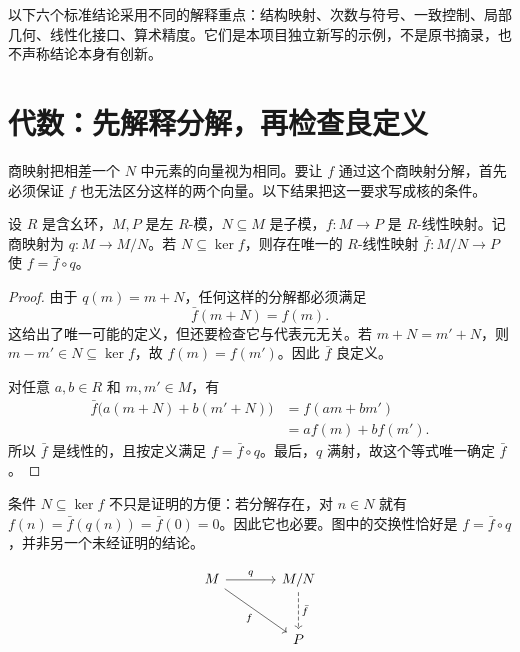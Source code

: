 \documentclass[11pt,a4paper,fontset=fandol,scheme=plain]{ctexart}
\begin{document}

以下六个标准结论采用不同的解释重点：结构映射、次数与符号、一致控制、局部几何、线性化接口、算术精度。它们是本项目独立新写的示例，不是原书摘录，也不声称结论本身有创新。

\medskip

\section{代数：先解释分解，再检查良定义}

商映射把相差一个 $N$ 中元素的向量视为相同。要让 $f$ 通过这个商映射分解，首先必须保证 $f$ 也无法区分这样的两个向量。以下结果把这一要求写成核的条件。

\begin{proposition}[商模因子化]\label{thm:quotient-factorization}

设 $R$ 是含幺环，$M,P$ 是左 $R$-模，$N\subseteq M$ 是子模，$f\colon M\to P$ 是 $R$-线性映射。记商映射为 $q\colon M\to M/N$。若 $N\subseteq\ker f$，则存在唯一的 $R$-线性映射 $\bar f\colon M/N\to P$ 使 $f=\bar f\circ q$。

\end{proposition}

\begin{proof}

由于 $q(m)=m+N$，任何这样的分解都必须满足
\[
\bar f(m+N)=f(m).
\]
这给出了唯一可能的定义，但还要检查它与代表元无关。若 $m+N=m'+N$，则 $m-m'\in N\subseteq\ker f$，故 $f(m)=f(m')$。因此 $\bar f$ 良定义。

对任意 $a,b\in R$ 和 $m,m'\in M$，有
\[
\begin{aligned}
\bar f\bigl(a(m+N)+b(m'+N)\bigr)
 &=f(am+bm')\\
 &=a f(m)+b f(m').
\end{aligned}
\]
所以 $\bar f$ 是线性的，且按定义满足 $f=\bar f\circ q$。最后，$q$ 满射，故这个等式唯一确定 $\bar f$。
\end{proof}

条件 $N\subseteq\ker f$ 不只是证明的方便：若分解存在，对 $n\in N$ 就有 $f(n)=\bar f(q(n))=\bar f(0)=0$。因此它也必要。图中的交换性恰好是 $f=\bar f\circ q$，并非另一个未经证明的结论。

\[
\begin{tikzcd}[column sep=large,row sep=large]
M \arrow[r,"q"] \arrow[dr,"f"'] & M/N \arrow[d,dashed,"\bar f"]\\
 & P
\end{tikzcd}
\]
\end{document}
